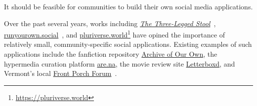 







\begin{requirement}[Personalization]
\label{requirements:personalization}
   It should be feasible for communities to build
   their own social media applications.
\end{requirement}

Over the past several years,
works including
\emph{\href{https://publicinfrastructure.org/2023/03/29/the-three-legged-stool/}{The Three-Legged Stool}}~\cite{threeleggedstool},
\href{https://runyourown.social}{runyourown.social}~\cite{runyourownsocial},
and \href{https://pluriverse.world/}{pluriverse.world}\footnote{
\url{https://pluriverse.world}
}
have opined the importance of relatively small,
community-specific social applications.
Existing examples of such applications include the fanfiction
repository \href{https://archiveofourown.org/}{Archive of Our Own},
the hypermedia curation platform \href{https://www.are.na}{are.na},
the movie review site \href{https://letterboxd.com/}{Letterboxd},
and Vermont's local \href{https://frontporchforum.com/}{Front Porch Forum}~\cite{threeleggedstool}.

